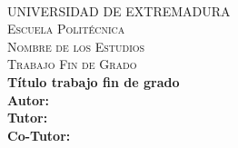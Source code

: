 \documentclass[12pt,a4paper,twoside]{book}
\begin{document}
\begin{titlepage}
    \begin{adjustwidth}{-1.5cm}{0cm}

        \vspace{-3.5em}
        \hspace{-0.5em}
        \begin{minipage}{0.45\textwidth}
            \begin{flushleft}
                
            \end{flushleft}
        \end{minipage}

        \vspace{-6em}
        \hspace{20em}
        \begin{minipage}{0.45\textwidth}
            \begin{flushright}
                
            \end{flushright}
        \end{minipage}\\[1.5cm]

        \begin{center}
            \textsc{\LARGE UNIVERSIDAD DE EXTREMADURA}\\[3cm]

            \textsc{\Large Escuela Politécnica}\\[0.5cm]
            \textsc{\Large Nombre de los Estudios}\\[2.5cm]
            \textsc{\Large Trabajo Fin de Grado}\\[0.5cm]
            { \large \bfseries Título trabajo fin de grado}\\[4.0cm]
            { \large \bfseries Autor: }\\[0.5cm]
            { \large \bfseries Tutor: }\\[0.5cm]
            { \large \bfseries Co-Tutor: }\\[0.5cm]
            \vfill
            {\large}
        \end{center}
    \end{adjustwidth}
\end{titlepage}
\makeatother
\thispagestyle{empty}
\newpage
\thispagestyle{empty}
\end{document}
